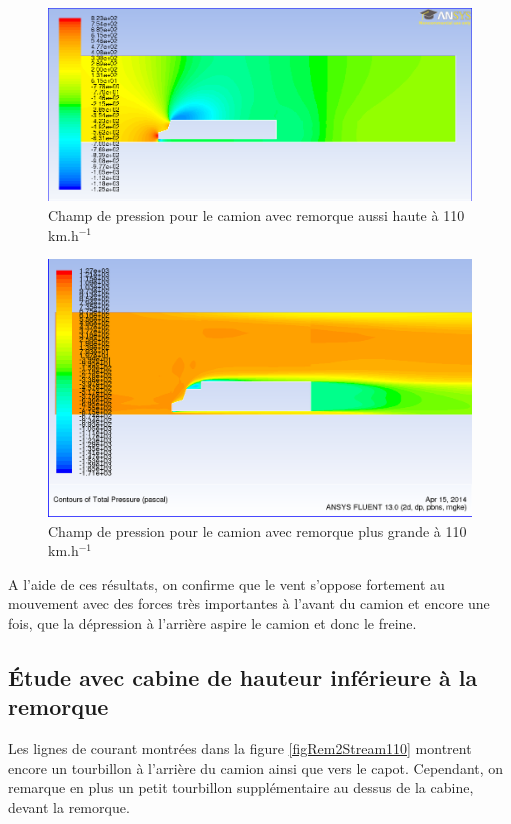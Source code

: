 \begin{figure}[!h]
\centering
\includegraphics[scale=0.4]{resultsCx/remorque1_110_pression.png}
\caption{Champ de pression pour le camion avec remorque aussi haute à 110 km.h$^{-1}$}
\label{figRem1Pres110}
\end{figure}

\begin{figure}[!h]
\centering
\includegraphics[scale=0.4]{resultsCx/remorque2-110_pressure.png}
\caption{Champ de pression pour le camion avec remorque plus grande à 110 km.h$^{-1}$}
\label{figRem2Pres110}
\end{figure}

A l'aide de ces résultats, on confirme que le vent s'oppose fortement au mouvement avec des forces très importantes à l'avant du camion et encore une fois, que la dépression à l'arrière aspire le camion et donc le freine.

\subsection{Étude avec cabine de hauteur inférieure à la remorque}
Les lignes de courant montrées dans la figure \ref{figRem2Stream110} montrent encore un tourbillon à l'arrière du camion ainsi que vers le capot. Cependant, on remarque en plus un petit tourbillon supplémentaire au dessus de la cabine, devant la remorque. \\ 

